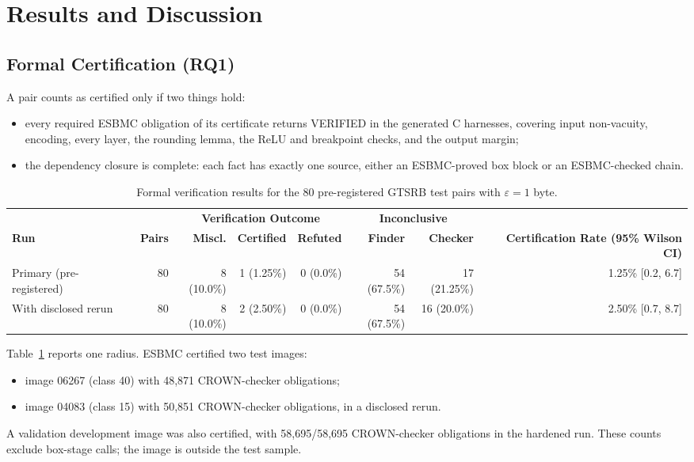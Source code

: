 \section{Results and Discussion}
\label{sec:results}

\subsection{Formal Certification (RQ1)}
A pair counts as certified only if two things hold:
\begin{itemize}
  \item every required ESBMC obligation of its certificate returns VERIFIED in the generated C harnesses, covering input non-vacuity, encoding, every layer, the rounding lemma, the ReLU and breakpoint checks, and the output margin;
  \item the dependency closure is complete: each fact has exactly one source, either an ESBMC-proved box block or an ESBMC-checked chain.
\end{itemize}

\begin{table}[t]
\centering
\caption{Formal verification results for the 80 pre-registered GTSRB test pairs with $\varepsilon=1$ byte.}
\label{tab:formal}
\scriptsize
\renewcommand{\arraystretch}{1.15}
\setlength{\tabcolsep}{7pt}
\begin{tabular}{lrrrrrrr}
\toprule
& & \multicolumn{3}{c}{\textbf{Verification Outcome}}
& \multicolumn{2}{c}{\textbf{Inconclusive}}
& \\
\cmidrule(lr){3-5}
\cmidrule(lr){6-7}
\textbf{Run}
& \textbf{Pairs}
& \textbf{Miscl.}
& \textbf{Certified}
& \textbf{Refuted}
& \textbf{Finder}
& \textbf{Checker}
& \textbf{Certification Rate (95\% Wilson CI)} \\
\midrule

Primary (pre-registered)
& 80
& 8 (10.0\%)
& 1 (1.25\%)
& 0 (0.0\%)
& 54 (67.5\%)
& 17 (21.25\%)
& 1.25\% [0.2, 6.7] \\

With disclosed rerun
& 80
& 8 (10.0\%)
& 2 (2.50\%)
& 0 (0.0\%)
& 54 (67.5\%)
& 16 (20.0\%)
& 2.50\% [0.7, 8.7] \\

\bottomrule
\end{tabular}

\end{table}

Table~\ref{tab:formal} reports one radius. ESBMC certified two test images:
\begin{itemize}
  \item image 06267 (class 40) with 48,871 CROWN-checker obligations;
  \item image 04083 (class 15) with 50,851 CROWN-checker obligations, in a disclosed rerun.
\end{itemize}
A validation development image was also certified, with 58,695/58,695 CROWN-checker obligations in the hardened run. These counts exclude box-stage calls; the image is outside the test sample.


